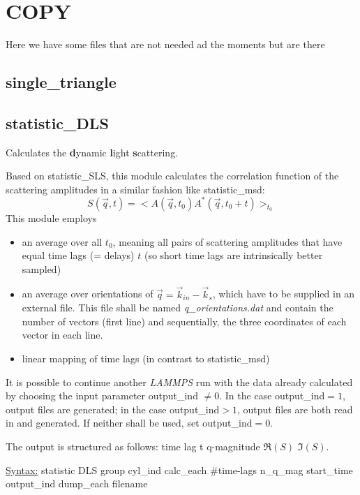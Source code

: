 \section{COPY}

Here we have some files that are not needed ad the moments but are there

\subsection{single\_triangle}

\subsection{statistic\_DLS}

Calculates the \textbf{d}ynamic \textbf{l}ight \textbf{s}cattering.

Based on statistic\_SLS, this module calculates the correlation function of the scattering amplitudes in a similar fashion like statistic\_msd:
%
\begin{equation}
S(\vec{q}, t) = < A(\vec{q},t_0)A^*(\vec{q},t_0+t) >_{t_0}
\label{eq:DLS}
\end{equation}
%
This module employs
%
\begin{itemize}
\item an average over all $t_0$, meaning all pairs of scattering amplitudes that have equal time lags (= delays) $t$ (so short time lags are intrinsically better sampled)
\item an average over orientations of $\vec{q} = \vec{k}_{in} - \vec{k}_{s}$, which have to be supplied in an external file. This file shall be named \textit{q\_orientations.dat} and contain the number of vectors (first line) and sequentially, the three coordinates of each vector in each line.
\item linear mapping of time lags (in contrast to statistic\_msd)
\end{itemize}
%
It is possible to continue another \textit{LAMMPS} run with the data already calculated by choosing the input parameter output\_ind $\neq 0$. In the case output\_ind$=1$, output files are generated; in the case output\_ind$>1$, output files are both read in and generated. If neither shall be used, set output\_ind$=0$.

The output is structured as follows: time lag t \quad q-magnitude \quad $\mathfrak{R} (S)$ \quad $\mathfrak{I} (S)$.

\underline{Syntax:} statistic	DLS group cyl\_ind calc\_each \#time-lags n\_q\_mag start\_time output\_ind dump\_each filename


